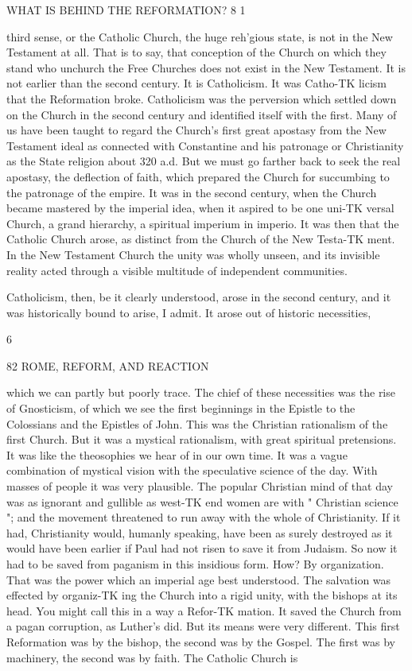 \documentclass[12pt,a5paper,twoside]{book}
\begin{document}
WHAT IS BEHIND THE REFORMATION? 8 1 

third sense, or the Catholic Church, the huge reh'gious 
state, is not in the New Testament at all. That is 
to say, that conception of the Church on which they 
stand who unchurch the Free Churches does not exist 
in the New Testament. It is not earlier than the 
second century. It is Catholicism. It was Catho-TK
licism that the Reformation broke. Catholicism was the 
perversion which settled down on the Church in the 
second century and identified itself with the first. 
Many of us have been taught to regard the Church's 
first great apostasy from the New Testament ideal as 
connected with Constantine and his patronage or 
Christianity as the State religion about 320 a.d. But 
we must go farther back to seek the real apostasy, 
the deflection of faith, which prepared the Church for 
succumbing to the patronage of the empire. It was in 
the second century, when the Church became mastered 
by the imperial idea, when it aspired to be one uni-TK
versal Church, a grand hierarchy, a spiritual imperium 
in imperio. It was then that the Catholic Church 
arose, as distinct from the Church of the New Testa-TK
ment. In the New Testament Church the unity was 
wholly unseen, and its invisible reality acted through 
a visible multitude of independent communities. 

Catholicism, then, be it clearly understood, arose 
in the second century, and it was historically bound 
to arise, I admit. It arose out of historic necessities, 

6 



82 ROME, REFORM, AND REACTION 

which we can partly but poorly trace. The chief of 
these necessities was the rise of Gnosticism, of which 
we see the first beginnings in the Epistle to the 
Colossians and the Epistles of John. This was the 
Christian rationalism of the first Church. But it was 
a mystical rationalism, with great spiritual pretensions. 
It was like the theosophies we hear of in our own 
time. It was a vague combination of mystical vision 
with the speculative science of the day. With masses 
of people it was very plausible. The popular Christian 
mind of that day was as ignorant and gullible as west-TK
end women are with " Christian science "; and the 
movement threatened to run away with the whole of 
Christianity. If it had, Christianity would, humanly 
speaking, have been as surely destroyed as it would 
have been earlier if Paul had not risen to save it from 
Judaism. So now it had to be saved from paganism 
in this insidious form. How? By organization. 
That was the power which an imperial age best 
understood. The salvation was effected by organiz-TK
ing the Church into a rigid unity, with the bishops 
at its head. You might call this in a way a Refor-TK
mation. It saved the Church from a pagan corruption, 
as Luther's did. But its means were very different. 
This first Reformation was by the bishop, the second 
was by the Gospel. The first was by machinery, 
the second was by faith. The Catholic Church is 
\end{document}

